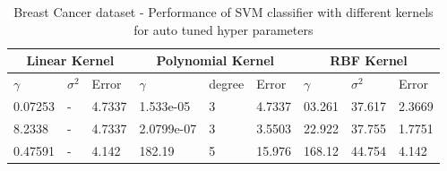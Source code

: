 \documentclass[12pt]{report}
\begin{document}
{\begin{table}[!htpb]
\begin{tabular}{ |p{1.2cm}|p{1.2cm}|p{1.2cm}||p{2cm}|p{1.2cm}|p{1.2cm}||p{1.2cm}|p{1.2cm}|p{1.2cm}|}
		\multicolumn{3}{|c||}{Linear Kernel} &\multicolumn{3}{|c||}{Polynomial Kernel}  &\multicolumn{3}{|c|}{RBF Kernel} \\ \hline	
		\cellcolor{blue!25}$\gamma$ &\cellcolor{blue!25}$\sigma^2$ & \cellcolor{blue!25}Error & \cellcolor{blue!25}$\gamma$ &\cellcolor{blue!25}degree &\cellcolor{blue!25}Error & \cellcolor{blue!25}$\gamma$ &\cellcolor{blue!25}$\sigma^2$ &\cellcolor{blue!25}Error \\ \hline
		0.07253 &-&4.7337 &1.533e-05 &3 &4.7337 &03.261 &37.617 &2.3669 \\ \hline
		8.2338 &- &4.7337 &2.0799e-07 &3  &3.5503 &22.922 &37.755 &1.7751 \\ \hline
		0.47591 &- &4.142 &182.19 &5 &15.976 &168.12 &44.754 &4.142 \\ \hline	
	\end{tabular}
	\caption{Breast Cancer dataset - Performance of SVM classifier with different kernels for auto tuned hyper parameters}
	\label{table:7}
\end{table}
}
\end{document}

